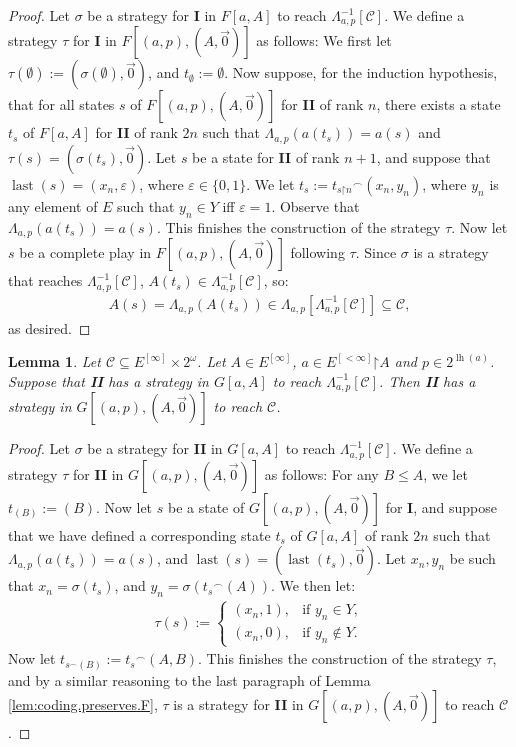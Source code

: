 \documentclass[11pt,reqno]{amsart}
\theoremstyle{plain}
\numberwithin{equation}{section}
\newtheorem{lemma}[theorem]{Lemma}
\theoremstyle{definition}
\newcommand{\func}{\operatorname}
\newcommand{\cal}{\mathcal}
\newcommand{\restrictedto}{\mathord{\upharpoonright}}
\newcommand{\lh}{\func{lh}}
\newcommand{\last}{\func{last}}
\begin{document}
\begin{proof}
    Let $\sigma$ be a strategy for \textbf{I} in $F[a,A]$ to reach $\Lambda_{a,p}^{-1}[\cal{C}]$. We define a strategy $\tau$ for \textbf{I} in $F[(a,p),(A,\vec{0})]$ as follows: We first let $\tau(\emptyset) := (\sigma(\emptyset),\vec{0})$, and $t_\emptyset := \emptyset$. Now suppose, for the induction hypothesis, that for all states $s$ of $F[(a,p),(A,\vec{0})]$ for \textbf{II} of rank $n$, there exists a state $t_s$ of $F[a,A]$ for \textbf{II} of rank $2n$ such that $\Lambda_{a,p}(a(t_s)) = a(s)$ and $\tau(s) = (\sigma(t_s),\vec{0})$. Let $s$ be a state for \textbf{II} of rank $n + 1$, and suppose that $\last(s) = (x_n,\varepsilon)$, where $\varepsilon \in \{0,1\}$. We let $t_s := {t_{s\restrictedto n}}^\frown(x_n,y_n)$, where $y_n$ is any element of $E$ such that $y_n \in Y$ iff $\varepsilon = 1$. Observe that $\Lambda_{a,p}(a(t_s)) = a(s)$. This finishes the construction of the strategy $\tau$. Now let $s$ be a complete play in $F[(a,p),(A,\vec{0})]$ following $\tau$. Since $\sigma$ is a strategy that reaches $\Lambda_{a,p}^{-1}[\cal{C}]$, $A(t_s) \in \Lambda_{a,p}^{-1}[\cal{C}]$, so:
    \begin{align*}
        A(s) = \Lambda_{a,p}(A(t_s)) \in \Lambda_{a,p}[\Lambda_{a,p}^{-1}[\cal{C}]] \subseteq \cal{C},
    \end{align*}
    as desired.
\end{proof}

\begin{lemma}
\label{lem:coding.preserves.G}
    Let $\cal{C} \subseteq E^{[\infty]} \times 2^\omega$. Let $A \in E^{[\infty]}$, $a \in E^{[<\infty]}\restrictedto A$ and $p \in 2^{\lh(a)}$. Suppose that \textbf{II} has a strategy in $G[a,A]$ to reach $\Lambda_{a,p}^{-1}[\cal{C}]$. Then \textbf{II} has a strategy in $G[(a,p),(A,\vec{0})]$ to reach $\cal{C}$.
\end{lemma}

\begin{proof}
    Let $\sigma$ be a strategy for \textbf{II} in $G[a,A]$ to reach $\Lambda_{a,p}^{-1}[\cal{C}]$. We define a strategy $\tau$ for \textbf{II} in $G[(a,p),(A,\vec{0})]$ as follows: For any $B \leq A$, we let $t_{(B)} := (B)$. Now let $s$ be a state of $G[(a,p),(A,\vec{0})]$ for \textbf{I}, and suppose that we have defined a corresponding state $t_s$ of $G[a,A]$ of rank $2n$ such that $\Lambda_{a,p}(a(t_s)) = a(s)$, and $\last(s) = (\last(t_s),\vec{0})$. Let $x_n,y_n$ be such that $x_n = \sigma(t_s)$, and $y_n = \sigma({t_s}^\frown(A))$. We then let:
    \begin{align*}
        \tau(s) := 
        \begin{cases}
            (x_n,1), &\text{if $y_n \in Y$}, \\
            (x_n,0), &\text{if $y_n \notin Y$}.
        \end{cases}
    \end{align*}
    Now let $t_{s^\frown{(B)}} := {t_s}^\frown(A,B)$. This finishes the construction of the strategy $\tau$, and by a similar reasoning to the last paragraph of Lemma \ref{lem:coding.preserves.F}, $\tau$ is a strategy for \textbf{II} in $G[(a,p),(A,\vec{0})]$ to reach $\cal{C}$.
\end{proof}
\end{document}
